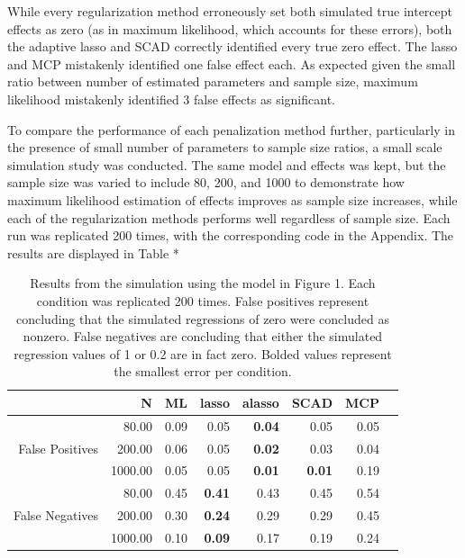 \documentclass[article]{jss}
\begin{document}
While every regularization method erroneously set both simulated true
intercept effects as zero (as in maximum likelihood, which accounts for
these errors), both the adaptive lasso and SCAD correctly identified
every true zero effect. The lasso and MCP mistakenly identified one
false effect each. As expected given the small ratio between number of
estimated parameters and sample size, maximum likelihood mistakenly
identified 3 false effects as significant.

To compare the performance of each penalization method further,
particularly in the presence of small number of parameters to sample
size ratios, a small scale simulation study was conducted. The same
model and effects was kept, but the sample size was varied to include
80, 200, and 1000 to demonstrate how maximum likelihood estimation of
effects improves as sample size increases, while each of the
regularization methods performs well regardless of sample size. Each run
was replicated 200 times, with the corresponding code in the Appendix.
The results are displayed in Table *

\begin{table}[ht]
    \centering
    \begin{tabular}{rrrrrrrr}
        \hline
        & N & ML & lasso & alasso & SCAD & MCP \\ 
        \hline
         & 80.00 & 0.09 & 0.05 & \textbf{0.04} & 0.05 & 0.05 \\ 
        False Positives & 200.00 & 0.06 & 0.05 & \textbf{0.02} & 0.03 & 0.04 \\ 
         & 1000.00 & 0.05 & 0.05 & \textbf{0.01} & \textbf{0.01} & 0.19 \\ 
         & 80.00 & 0.45 & \textbf{0.41} & 0.43 & 0.45 & 0.54 \\ 
        False Negatives & 200.00 & 0.30 & \textbf{0.24} & 0.29 & 0.29 & 0.45 \\ 
         & 1000.00 & 0.10 & \textbf{0.09} & 0.17 & 0.19 & 0.24 \\ 
        \hline
    \end{tabular}
    \caption{Results from the simulation using the model in Figure 1. Each condition was replicated 200 times. False positives represent concluding that the simulated regressions of zero were concluded as nonzero. False negatives are concluding that either the simulated regression values of 1 or 0.2 are in fact zero. Bolded values represent the smallest error per condition.}
\end{table}
\end{document}
